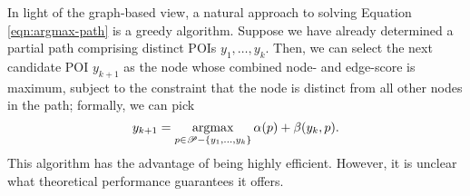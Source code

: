 
In light of the graph-based view, a natural approach to solving Equation \ref{eqn:argmax-path} is a greedy algorithm.
Suppose we have already determined a partial path comprising distinct POIs $y_1, \ldots, y_k$.
Then, we can select the next candidate POI $y_{k + 1}$ as
the node whose combined node- and edge-score is maximum,
subject to the constraint that the node is distinct from all other nodes in the path;
formally, we can pick
$$ y_{k + 1} = \operatorname*{argmax}_{p \in \mathscr{P} - \{ y_1, \ldots, y_k \}} \alpha( p ) + \beta( y_k, p ). $$
This algorithm has the advantage of being highly efficient.
However, it is unclear what theoretical performance guarantees it offers.
